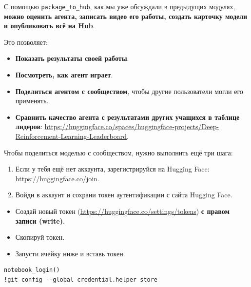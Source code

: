 \documentclass[11pt,a4paper]{article}
\begin{document}
С помощью \texttt{package\_to\_hub}, как мы уже обсуждали в предыдущих модулях, \textbf{можно оценить агента, записать видео его работы, создать карточку модели и опубликовать всё на Hub}.

Это позволяет:

\begin{itemize}
\tightlist
\item
  \textbf{Показать результаты своей работы}.
\item
  \textbf{Посмотреть, как агент играет}.
\item
  \textbf{Поделиться агентом с сообществом}, чтобы другие пользователи могли его применять.
\item
  \textbf{Сравнить качество агента с результатами других учащихся в таблице лидеров}: \url{https://huggingface.co/spaces/huggingface-projects/Deep-Reinforcement-Learning-Leaderboard}.
\end{itemize}

Чтобы поделиться моделью с сообществом, нужно выполнить ещё три шага:

\begin{enumerate}
\def\labelenumi{\arabic{enumi}.}
\item
  Если у тебя ещё нет аккаунта, зарегистрируйся на Hugging Face: \url{https://huggingface.co/join}.
\item
  Войди в аккаунт и сохрани токен аутентификации с сайта Hugging Face.
\end{enumerate}

\begin{itemize}
\tightlist
\item
  Создай новый токен (\url{https://huggingface.co/settings/tokens}) \textbf{с правом записи (write)}.
\end{itemize}


\begin{itemize}
\tightlist
\item
  Скопируй токен.
\item
  Запусти ячейку ниже и вставь токен.
\end{itemize}

\begin{lstlisting}
notebook_login()
!git config --global credential.helper store
\end{lstlisting}
\end{document}
